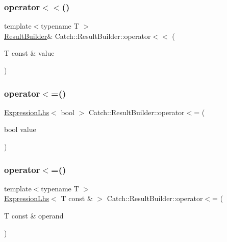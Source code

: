 \hypertarget{class_catch_1_1_result_builder_a5aa79ce6160ab8cd800eb65bbd7a28a4}{}\label{class_catch_1_1_result_builder_a5aa79ce6160ab8cd800eb65bbd7a28a4} 
\subsubsection{\texorpdfstring{operator$<$$<$()}{operator<<()}}
{\footnotesize\ttfamily template$<$typename T $>$ \\
\hyperlink{class_catch_1_1_result_builder}{Result\+Builder}\& Catch\+::\+Result\+Builder\+::operator$<$$<$ (\begin{DoxyParamCaption}\item[{T const \&}]{value }\end{DoxyParamCaption})\hspace{0.3cm}{\ttfamily [inline]}}

\hypertarget{class_catch_1_1_result_builder_a3b87b20bcd1ef9e630880e59eeefba2a}{}\label{class_catch_1_1_result_builder_a3b87b20bcd1ef9e630880e59eeefba2a} 
\subsubsection{\texorpdfstring{operator$<$=()}{operator<=()}\hspace{0.1cm}{\footnotesize\ttfamily [1/2]}}
{\footnotesize\ttfamily \hyperlink{class_catch_1_1_expression_lhs}{Expression\+Lhs}$<$ bool $>$ Catch\+::\+Result\+Builder\+::operator$<$= (\begin{DoxyParamCaption}\item[{bool}]{value }\end{DoxyParamCaption})\hspace{0.3cm}{\ttfamily [inline]}}

\hypertarget{class_catch_1_1_result_builder_ad76939f5a52fcb534f97b49a0b7bc560}{}\label{class_catch_1_1_result_builder_ad76939f5a52fcb534f97b49a0b7bc560} 
\subsubsection{\texorpdfstring{operator$<$=()}{operator<=()}\hspace{0.1cm}{\footnotesize\ttfamily [2/2]}}
{\footnotesize\ttfamily template$<$typename T $>$ \\
\hyperlink{class_catch_1_1_expression_lhs}{Expression\+Lhs}$<$ T const  \& $>$ Catch\+::\+Result\+Builder\+::operator$<$= (\begin{DoxyParamCaption}\item[{T const \&}]{operand }\end{DoxyParamCaption})\hspace{0.3cm}{\ttfamily [inline]}}

